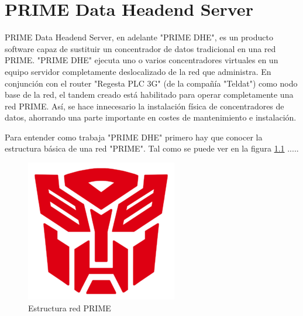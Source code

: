 \chapter{PRIME Data Headend Server}
PRIME Data Headend Server, en adelante "PRIME DHE", es un producto software capaz de sustituir un concentrador de datos tradicional en una red PRIME. "PRIME DHE" ejecuta uno o varios concentradores virtuales en un equipo servidor completamente deslocalizado de la red que administra. En conjunción con el router "Regesta PLC 3G" (de la compañía "Teldat") como nodo base de la red, el tandem creado está habilitado para operar completamente una red PRIME. Así, se hace innecesario la instalación física de concentradores de datos, ahorrando una parte importante en costes de mantenimiento e instalación.

Para entender como trabaja "PRIME DHE" primero hay que conocer la estructura básica de una red "PRIME". Tal como se puede ver en la figura \ref{fig:EstructuraPRIME} .....

\begin{figure}[htbp]
	\centering
	\includegraphics{Img/dummy.png}
	\caption{Estructura red PRIME}
	\label{fig:EstructuraPRIME}
\end{figure}